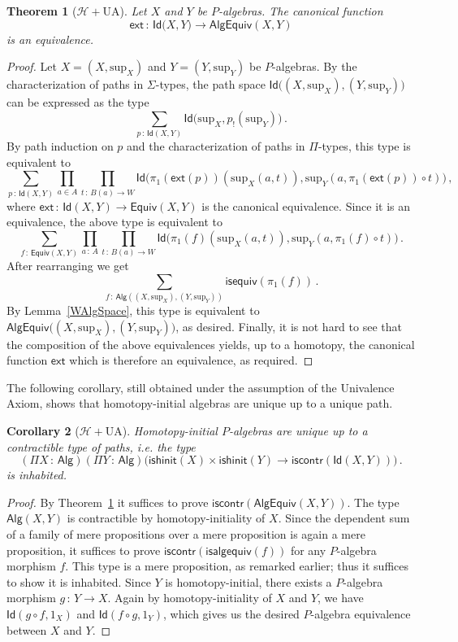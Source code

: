 \documentclass[10pt,a4paper,oneside,reqno]{amsart}
\theoremstyle{mythm}
\newtheorem{theorem}{Theorem}[section]
\newtheorem{corollary}[theorem]{Corollary}
\theoremstyle{mydef}
\theoremstyle{myrmk}
\newcommand{\co}{\,{:}\,}
\newcommand{\Hint}{\mathcal{H}}
\newcommand{\UA}{\mathrm{UA}}
\newcommand{\iscontr}{\mathsf{iscontr}}
\newcommand{\isequiv}{\mathsf{isequiv}}
\newcommand{\isalghinit}{\mathsf{ishinit}}
\newcommand{\ext}{\mathsf{ext}}
\newcommand{\Id}{\mathsf{Id}}
\newcommand{\Palg}{\mathsf{Alg}}
\renewcommand{\sup}{\mathrm{sup}}
\newcommand{\isalgequiv}{\mathsf{isalgequiv}}
\newcommand{\AlgEquiv}{\mathsf{AlgEquiv}}
\begin{document}
\begin{theorem}[$\Hint + \UA$] \label{thm:Punivalence}
Let $X$ and $Y$ be $P$-algebras. The canonical function
\[ 
\ext \co \Id \big(X,Y\big) \to  \AlgEquiv(X,Y) 
\]
is an equivalence.
\end{theorem}

\begin{proof} 
Let $X = (X,\sup_X)$ and $Y= (Y,\sup_Y)$ be $P$-algebras. By the characterization of paths in $\Sigma$-types, the path space 
$\Id \big( (X,\sup_X) ,  (Y,\sup_Y) \big)$ can be expressed as the type
\[
\sum_{p \co \Id(X, Y)} \Id \big( \sup_X ,  p_{!}(\sup_Y)  \big) \, .
\]
By path induction on $p$ and the characterization of paths in $\Pi$-types, this type is equivalent to
\[  
\sum_{p \co \Id(X,Y)}  
\prod_{a \in A} 
\prod_{t \co B(a) \to W} 
\Id \big(  \pi_1(\ext(p))( \sup_X(a,t)),  \sup_Y(a, \pi_1(\ext (p)) \circ t) \big) \, , 
\]
where $\ext \co \Id(X,Y) \to \mathsf{Equiv}(X,Y)$ is the canonical equivalence. Since it is an equivalence, the above type is equivalent to
\[
\sum_{f \co \mathsf{Equiv}(X,Y)} \prod_{a \co A} \prod_{t \co B(a) \to W} \Id \big( \pi_1(f) (\sup_X(a,t))  , \sup_Y (a, \pi_1(f) \circ t) \big) \, .
\]
After rearranging we get
\[
\sum_{f \co \Palg ( (X,\sup_X),  (Y,\sup_Y) )}  \isequiv(\pi_1(f)) \, .
\]
By Lemma~\ref{WAlgSpace}, this type is equivalent to $\AlgEquiv \big( (X,\sup_X),  (Y,\sup_Y)\big)$, as desired. Finally, it is not hard to see that the composition of the above equivalences yields, up to a homotopy, the canonical function $\ext$ which is therefore an equivalence, as required.
\end{proof} 

The following corollary, still obtained under the assumption of the Univalence Axiom, shows that
homotopy-initial algebras are unique up to a unique path.

\begin{corollary}[$\Hint + \UA$] \label{WHInitIso}
Homotopy-initial $P$-algebras are unique up to a  contractible type of paths, i.e. the type
\[ 
(\Pi X \co \Palg) (\Pi Y \co \Palg) \big( \isalghinit(X) \times \isalghinit(Y)  \to 
\iscontr(\Id(X,Y)) \big) \, .
\] 
is inhabited.
\end{corollary}

\begin{proof}
By Theorem~\ref{thm:Punivalence} it suffices to prove $\iscontr(\AlgEquiv(X,Y))$. The type $\Palg(X,Y)$ is contractible by homotopy-initiality of $X$. Since the dependent sum of a family of mere propositions over a mere proposition is again a mere proposition, it suffices to prove $\iscontr(\isalgequiv(f))$ for any $P$-algebra morphism $f$. This type is a mere proposition, as remarked earlier; thus it suffices to show it is inhabited.
Since $Y$ is homotopy-initial, there exists a $P$-algebra morphism $g \co Y \to X$. Again by homotopy-initiality of $X$ and 
$Y$, we have $\Id(g \circ f, 1_X)$ and $\Id(f \circ g, 1_Y)$, which gives us the desired $P$-algebra equivalence between 
$X$ and $Y$.
\end{proof}
\end{document}
